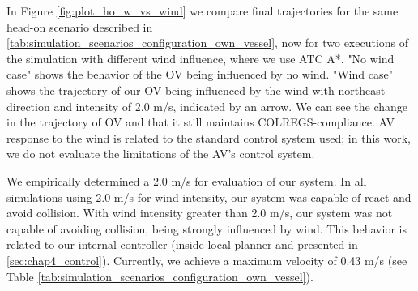         In Figure \ref{fig:plot_ho_w_vs_wind} we compare final trajectories for the same head-on scenario described in \ref{tab:simulation_scenarios_configuration_own_vessel}, now for two executions of the simulation with different wind influence, where we use \ac{ATC} A*. "No wind case" shows the behavior of the \ac{OV} being influenced by no wind. "Wind case" shows the trajectory of our \ac{OV} being influenced by the wind with northeast direction and intensity of 2.0 m/s, indicated by an arrow. We can see the change in the trajectory of \ac{OV} and that it still maintains COLREGS-compliance. \ac{AV} response to the wind is related to the standard control system used; in this work, we do not evaluate the limitations of the \ac{AV}'s control system.
        

        We empirically determined a 2.0 m/s for evaluation of our system. In all simulations using 2.0 m/s for wind intensity, our system was capable of react and avoid collision. With wind intensity greater than 2.0 m/s, our system was not capable of avoiding collision, being strongly influenced by wind. This behavior is related to our internal controller (inside local planner and presented in \ref{sec:chap4_control}). Currently, we achieve a maximum velocity of 0.43 m/s (see Table \ref{tab:simulation_scenarios_configuration_own_vessel}). 
        
